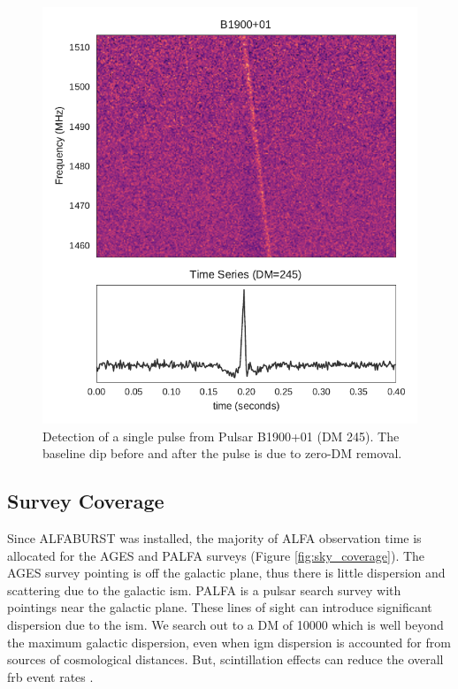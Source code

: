 \documentclass[a4paper,fleqn,usenatbib]{mnras}
\begin{document}
\begin{figure}
    \includegraphics[width=1.0\linewidth]{figures/B1900_01.pdf}
    \caption{Detection of a single pulse from Pulsar B1900+01 (DM 245). The
    baseline dip before and after the pulse is due to zero-DM removal.
    }
    \label{fig:B1900}
\end{figure}



\subsection{Survey Coverage}
\label{sec:survey_coverage}

Since ALFABURST was installed, the majority of ALFA observation time is
allocated for the AGES \citep{2006MNRAS.371.1617A} and PALFA
\citep{2006ApJ...637..446C} surveys (Figure \ref{fig:sky_coverage}).  The AGES
survey pointing is off the galactic plane, thus there is little dispersion and
scattering due to the galactic \gls{ism}. PALFA is a pulsar search survey with
pointings near the galactic plane. These lines of sight can introduce
significant dispersion due to the \gls{ism}. We search out to a DM of 10000
which is well beyond the maximum galactic dispersion, even when \gls{igm}
dispersion is accounted for from sources of cosmological distances.  But,
scintillation effects can reduce the overall \gls{frb} event rates
\citep{2015MNRAS.451.3278M}.
\end{document}
